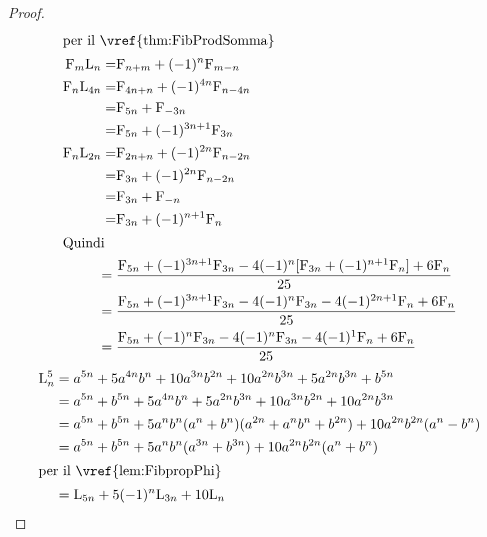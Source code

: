 \begin{proof}
\begin{align*}
	\intertext{per il~\vref{thm:FibProdSomma}}
	\Fib{m}\Luc{n}=&\Fib{n+m}+(-1)^n\Fib{m-n}\\
	\Fib{n}\Luc{4n}=&\Fib{4n+n}+(-1)^{4n}\Fib{n-4n}\\
	=&\Fib{5n}+\Fib{-3n}\\
	=&\Fib{5n}+(-1)^{3n+1}\Fib{3n}\\
	\Fib{n}\Luc{2n}=&\Fib{2n+n}+(-1)^{2n}\Fib{n-2n}\\
	=&\Fib{3n}+(-1)^{2n}\Fib{n-2n}\\
	=&\Fib{3n}+\Fib{-n}\\
	=&\Fib{3n}+(-1)^{n+1}\Fib{n}\\
	\intertext{Quindi}
	={}&\dfrac{\Fib{5n}+(-1)^{3n+1}\Fib{3n}-4(-1)^n[\Fib{3n}+(-1)^{n+1}\Fib{n}]+6\Fib{n}}{25}\\
	={}&\dfrac{\Fib{5n}+(-1)^{3n+1}\Fib{3n}-4(-1)^n\Fib{3n}-4(-1)^{2n+1}\Fib{n}+6\Fib{n}}{25}\\
	={}&\dfrac{\Fib{5n}+(-1)^{n}\Fib{3n}-4(-1)^n\Fib{3n}-4(-1)^{1}\Fib{n}+6\Fib{n}}{25}\\
\end{align*}
\begin{align*}
	\Luc{n}^5={}&a^{5n}+5a^{4n}b^{n}+10a^{3n}b^{2n}+10a^{2n}b^{3n}+5a^{2n}b^{3n}+b^{5n}\\
	={}&a^{5n}+b^{5n}+5a^{4n}b^{n}+5a^{2n}b^{3n}+10a^{3n}b^{2n}+10a^{2n}b^{3n}\\
	={}&a^{5n}+b^{5n}+5a^nb^n(a^n+b^n)(a^{2n}+a^nb^n+b^{2n})+10a^{2n}b^{2n}(a^n-b^n)\\
	={}&a^{5n}+b^{5n}+5a^nb^n(a^{3n}+b^{3n})+10a^{2n}b^{2n}(a^n+b^n)\\
	\intertext{per il~\vref{lem:FibpropPhi}} 
	={}&\Luc{5n}+5(-1)^n\Luc{3n}+10\Luc{n}\\	
\end{align*}
\end{proof}